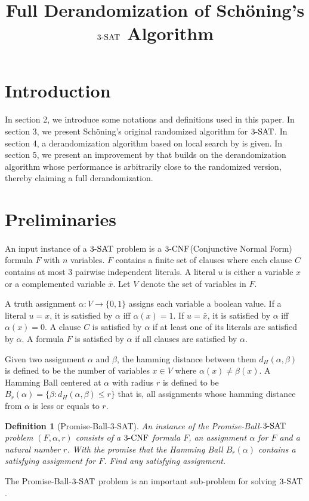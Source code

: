 \documentclass{article}
\title{Full Derandomization of Sch\"{o}ning's $\SAT$ Algorithm}
\author{}
\date{}
\newcommand{\SAT}{\textnormal{$3$-SAT}}
\newcommand{\CNF}{\textnormal{$3$-CNF}}
\newcommand{\dist}[2]{d_H(#1,#2)}
\newcommand{\ball}[2]{B_{#1}(#2)}
\newtheorem{definition}{Definition}
\begin{document}
\maketitle

\section{Introduction}
\paragraph{} In section 2, we introduce some notations and definitions used in this paper. In section 3, we present Sch\"{o}ning's original randomized algorithm\cite{Schoning99} for $\SAT$. In section 4, a derandomization algorithm based on local search by \cite{Dantsin02} is given. In section 5, we present an improvement by \cite{Moser11} that builds on the derandomization algorithm whose performance is arbitrarily close to the randomized version, thereby claiming a full derandomization.

\section{Preliminaries}
\paragraph{} An input instance of a $\SAT$ problem is a $\CNF$(Conjunctive Normal Form) formula $F$ with $n$ variables. $F$ contains a finite set of clauses where each clause $C$ contains at most $3$ pairwise independent literals. A literal $u$ is either a variable $x$ or a complemented variable $\bar{x}$. Let $V$ denote the set of variables in $F$. \par 
A truth assignment $\alpha: V\rightarrow \{0,1\}$ assigns each variable a boolean value. If a literal $u = x$, it is satisfied by $\alpha$ iff $\alpha(x) = 1$. If $u = \bar{x}$, it is satisfied by $\alpha$ iff $\alpha(x) = 0$. A clause $C$ is satisfied by $\alpha$ if at least one of its literals are satisfied by $\alpha$. A formula $F$ is satisfied by $\alpha$ if all clauses are satisfied by $\alpha$. \par 
Given two assignment $\alpha$ and $\beta$, the hamming distance between them $\dist{\alpha}{\beta}$ is defined to be the number of variables $x \in V$ where $\alpha(x) \neq \beta(x)$. A Hamming Ball centered at $\alpha$ with radius $r$ is defined to be $\ball{r}{\alpha} = \{\beta: \dist{\alpha}{\beta} \leq r\}$ that is, all assignments whose hamming distance from $\alpha$ is less or equals to $r$. \par 
\begin{definition}[Promise-Ball-\SAT\cite{Moser11}]
	An instance of the Promise-Ball-$\SAT$ problem $(F,\alpha,r)$ consists of a $\CNF$ formula $F$, an assignment $\alpha$ for $F$ and a natural number $r$. With the promise that the Hamming Ball $\ball{r}{\alpha}$ contains a satisfying assignment for $F$. Find any satisfying assignment.
\end{definition}
The Promise-Ball-$\SAT$ problem is an important sub-problem for solving $\SAT$. 
\end{document}
